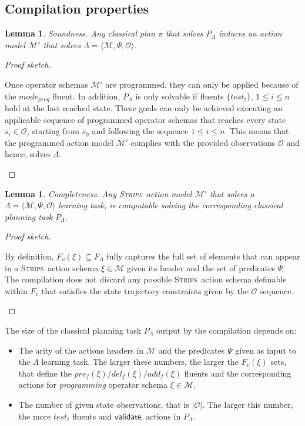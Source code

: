 \documentclass{article}
\newcommand{\tup}[1]{{\langle #1 \rangle}}
\newcommand{\strips}{\textsc{Strips}}     %
\newtheorem{lemma}[theorem]{Lemma}
\begin{document}
\subsection{Compilation properties}

\begin{lemma}
Soundness. Any classical plan $\pi$ that solves $P_{\Lambda}$ induces an action model $\mathcal{M}'$ that solves $\Lambda=\tup{\mathcal{M},\Psi,\mathcal{O}}$.
\end{lemma}

\begin{proof}[Proof sketch]
\begin{small}
Once operator schemas $\mathcal{M}'$ are programmed, they can only be applied because of the $mode_{prog}$ fluent. In addition, $P_{\Lambda}$ is only solvable if fluents $\{test_i\}$, {\small $1\leq i\leq n$} hold at the last reached state. These goals can only be achieved executing an applicable sequence of programmed operator schemas that reaches every state $s_i\in\mathcal{O}$, starting from $s_0$ and following the sequence {\small $1\leq i\leq n$}. This means that the programmed action model $\mathcal{M}'$ complies with the provided observations $\mathcal{O}$ and hence, solves $\Lambda$.
\end{small}
\end{proof}


\begin{lemma}
Completeness. Any \strips\ action model $\mathcal{M}'$ that solves a $\Lambda=\tup{\mathcal{M},\Psi,\mathcal{O}}$ learning task, is computable solving the corresponding classical planning task $P_{\Lambda}$.
\end{lemma}

\begin{proof}[Proof sketch]
\begin{small}
By definition, $F_v(\xi)\subseteq F_\Lambda$ fully captures the full set of elements that can appear in a \strips\ action schema $\xi\in\mathcal{M}$ given its header and the set of predicates $\Psi$. The compilation does not discard any possible \strips\ action schema definable within $F_v$ that satisfies the state trajectory constraints given by the $\mathcal{O}$ sequence.
\end{small}
\end{proof}

The size of the classical planning task $P_{\Lambda}$ output by the compilation depends on:
\begin{itemize}
\item The arity of the actions headers in $\mathcal{M}$ and the predicates $\Psi$ given as input to the $\Lambda$ learning task. The larger these numbers, the larger the $F_v(\xi)$ sets, that define the $pre_f(\xi)/del_f(\xi)/add_f(\xi)$ fluents and the corresponding actions for {\em programming} operator schema $\xi\in\mathcal{M}$.
\item The number of given state observations, that is $|\mathcal{O}|$. The larger this number, the more $test_i$ fluents and $\mathsf{validate_{i}}$ actions in $P_{\Lambda}$.
\end{itemize}
\end{document}
